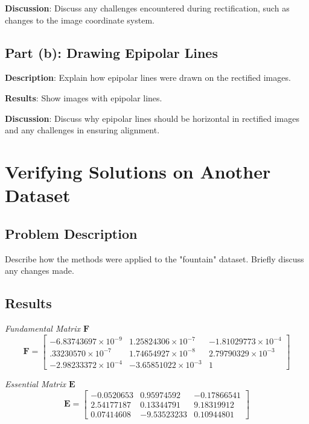 \documentclass{article}
\begin{document}
\textbf{Discussion}: Discuss any challenges encountered during rectification, such as changes to the image coordinate system.

\subsection{Part (b): Drawing Epipolar Lines}
\textbf{Description}: Explain how epipolar lines were drawn on the rectified images.

\textbf{Results}: Show images with epipolar lines.


\textbf{Discussion}: Discuss why epipolar lines should be horizontal in rectified images and any challenges in ensuring alignment.

\section{Verifying Solutions on Another Dataset}
\subsection{Problem Description}
Describe how the methods were applied to the "fountain" dataset. Briefly discuss any changes made.

\subsection{Results}

\textit{Fundamental Matrix $\mathbf{F}$}
\[
\mathbf{F} = \begin{bmatrix} 
-6.83743697 \times 10^{-9} & 1.25824306 \times 10^{-7} & -1.81029773 \times 10^{-4} \\ 
.33230570 \times 10^{-7} & 1.74654927 \times 10^{-8} & 2.79790329 \times 10^{-3} \\ 
-2.98233372 \times 10^{-4} & -3.65851022 \times 10^{-3} & 1 
\end{bmatrix}
\]

\textit{Essential Matrix $\mathbf{E}$}
\[
\mathbf{E} = \begin{bmatrix}
-0.0520653 & 0.95974592 & -0.17866541 \\ 
2.54177187 & 0.13344791 & 9.18319912 \\ 
0.07414608 & -9.53523233 & 0.10944801 
\end{bmatrix}
\]
\end{document}
